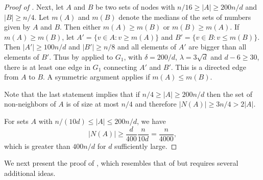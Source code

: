 \documentclass{toc}
\begin{document}
\begin{proof}[Proof of ]
Next, let $A$ and $B$ be two sets of nodes with $n/16 \geq |A| \geq 200 n / d$
and $|B| \geq n/4$. Let $m(A)$ and $m(B)$ denote the medians of the sets of
numbers given by $A$ and $B$.  Then either $m(A) \geq m(B)$ or 
$m(B) \geq m(A)$. If  $m(A) \geq m(B)$, let $A' = \{ v \in A : v \geq m(A)\}$
and $B' = \{v \in B : v \leq m(B)\}$.
Then $|A'| \geq 100 n / d$ and $|B'| \geq n/8$ and all elements of $A'$ are
bigger than all elements of $B'$. 
Thus by  applied to $G_1$, with
$\delta = 200/d$, 
$\lambda = 3 \sqrt{d}$ and $d-6 \geq 30$, 
there is at least one edge in 
 $G_1$ connecting $A'$ and $B'$. 
This is a directed edge from $A$ to $B$. A symmetric argument applies
if $m(A) \leq m(B)$. 

Note that the last statement implies that if $n/4 \geq |A| \geq 200 n / d$
then the set of non-neighbors of $A$ is of size at most $n/4$ and
therefore $|N(A)| \geq 3 n/4 > 2 |A|$. 

For sets $A$ with $n / (10d) \leq |A| \leq 200 n / d$, we have 
\[
|N(A)| \geq  \frac{d}{400} \frac{n}{10 d} = \frac{n}{4000},
\]
which is greater than $400 n / d$ for $d$ sufficiently large.  
%
\end{proof}
%
%

\noindent
We next present the proof of , which resembles that of
 but requires several additional ideas.
\vspace{0.2cm}
\end{document}
